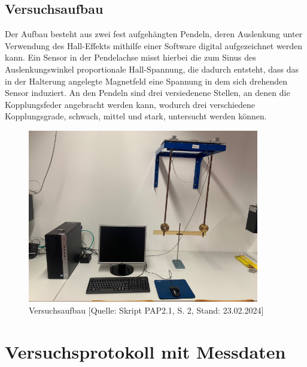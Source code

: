 \documentclass{article}
\begin{document}
\subsection{Versuchsaufbau}

Der Aufbau besteht aus zwei fest aufgehängten Pendeln, deren Auslenkung unter Verwendung des Hall-Effekts mithilfe einer Software digital aufgezeichnet werden kann. Ein Sensor in der Pendelachse misst hierbei die zum Sinus des Auslenkungswinkel proportionale Hall-Spannung, die dadurch entsteht, dass das in der Halterung angelegte Magnetfeld eine Spannung in dem sich drehenden Sensor induziert. An den Pendeln sind drei versiedenene Stellen, an denen die Kopplungsfeder angebracht werden kann, wodurch drei verschiedene Kopplungsgrade, schwach, mittel und stark, untersucht werden können. 

\phantom{.}

\begin{figure}[!h]
    \centering
    \includegraphics[width=0.9\textwidth]{graphics/Aufbau.png}
    \caption{Versuchsaufbau [Quelle: Skript PAP2.1, S. 2, Stand: 23.02.2024]}
    \label{fig:Aufbau}
\end{figure}

\newpage

\section{Versuchsprotokoll mit Messdaten}
\end{document}

